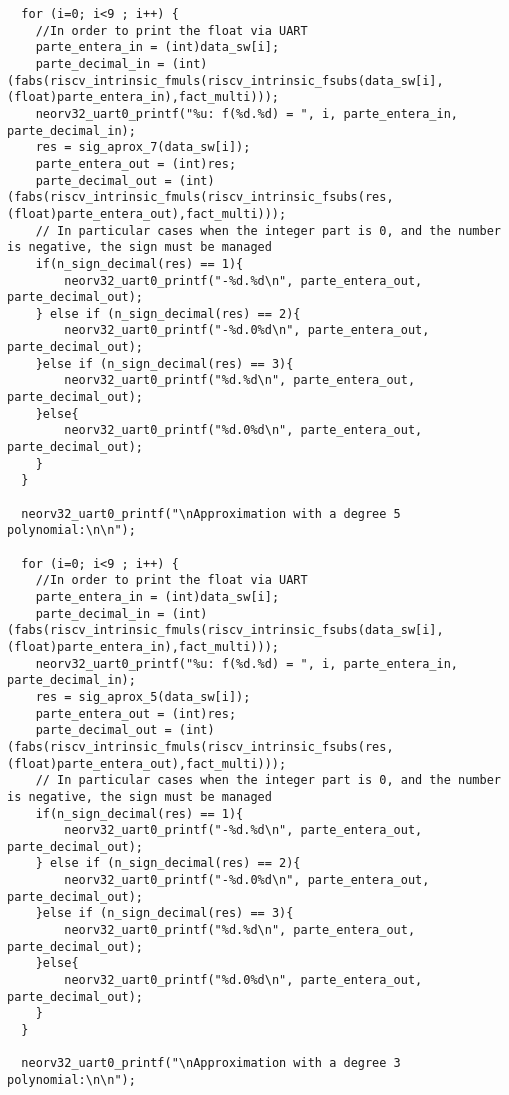 \begin{code}
\begin{verbatim}
  for (i=0; i<9 ; i++) {
    //In order to print the float via UART
    parte_entera_in = (int)data_sw[i];
    parte_decimal_in = (int)(fabs(riscv_intrinsic_fmuls(riscv_intrinsic_fsubs(data_sw[i], (float)parte_entera_in),fact_multi)));
    neorv32_uart0_printf("%u: f(%d.%d) = ", i, parte_entera_in, parte_decimal_in);
    res = sig_aprox_7(data_sw[i]);
    parte_entera_out = (int)res;
    parte_decimal_out = (int)(fabs(riscv_intrinsic_fmuls(riscv_intrinsic_fsubs(res, (float)parte_entera_out),fact_multi)));
    // In particular cases when the integer part is 0, and the number is negative, the sign must be managed
    if(n_sign_decimal(res) == 1){
        neorv32_uart0_printf("-%d.%d\n", parte_entera_out, parte_decimal_out);
    } else if (n_sign_decimal(res) == 2){
        neorv32_uart0_printf("-%d.0%d\n", parte_entera_out, parte_decimal_out);
    }else if (n_sign_decimal(res) == 3){
        neorv32_uart0_printf("%d.%d\n", parte_entera_out, parte_decimal_out);
    }else{
        neorv32_uart0_printf("%d.0%d\n", parte_entera_out, parte_decimal_out);
    }
  } 

  neorv32_uart0_printf("\nApproximation with a degree 5 polynomial:\n\n");

  for (i=0; i<9 ; i++) {
    //In order to print the float via UART
    parte_entera_in = (int)data_sw[i];
    parte_decimal_in = (int)(fabs(riscv_intrinsic_fmuls(riscv_intrinsic_fsubs(data_sw[i], (float)parte_entera_in),fact_multi)));
    neorv32_uart0_printf("%u: f(%d.%d) = ", i, parte_entera_in, parte_decimal_in);
    res = sig_aprox_5(data_sw[i]);
    parte_entera_out = (int)res;
    parte_decimal_out = (int)(fabs(riscv_intrinsic_fmuls(riscv_intrinsic_fsubs(res, (float)parte_entera_out),fact_multi)));
    // In particular cases when the integer part is 0, and the number is negative, the sign must be managed
    if(n_sign_decimal(res) == 1){
        neorv32_uart0_printf("-%d.%d\n", parte_entera_out, parte_decimal_out);
    } else if (n_sign_decimal(res) == 2){
        neorv32_uart0_printf("-%d.0%d\n", parte_entera_out, parte_decimal_out);
    }else if (n_sign_decimal(res) == 3){
        neorv32_uart0_printf("%d.%d\n", parte_entera_out, parte_decimal_out);
    }else{
        neorv32_uart0_printf("%d.0%d\n", parte_entera_out, parte_decimal_out);
    }
  } 

  neorv32_uart0_printf("\nApproximation with a degree 3 polynomial:\n\n");


\end{verbatim}
\end{code}
